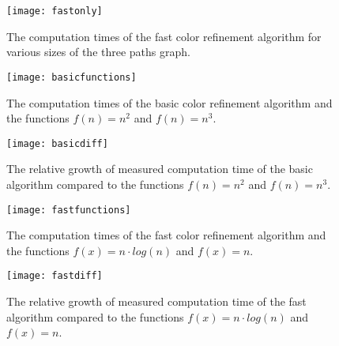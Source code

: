 \documentclass[twoside]{article}
\begin{document}
\begin{appendices}
\begin{multicols}{2}
\begin{figure}[H]
	\texttt{[image: fastonly]}
	\caption{The computation times of the fast color refinement algorithm for various sizes of the three paths graph.}
	\label{fig:fastonly}
\end{figure}

\begin{figure}[H]
	\texttt{[image: basicfunctions]}
	\caption{The computation times of the basic color refinement algorithm and the functions $f(n)=n^2$ and $f(n)=n^3$.}
	\label{fig:basicfunctions}
\end{figure}

\begin{figure}[H]
	\texttt{[image: basicdiff]}
	\caption{The relative growth of measured computation time of the basic algorithm compared to the functions $f(n)=n^2$ and $f(n)=n^3$.}
	\label{fig:basicgrowth}
\end{figure}

\begin{figure}[H]
	\texttt{[image: fastfunctions]}
	\caption{The computation times of the fast color refinement algorithm and the functions $f(x)=n\cdot log(n)$ and $f(x)=n$.}
	\label{fig:fastfunctions}
\end{figure}

\begin{figure}[H]
	\texttt{[image: fastdiff]}
	\caption{The relative growth of measured computation time of the fast algorithm compared to the functions $f(x)=n\cdot log(n)$ and $f(x)=n$.}
	\label{fig:fastgrowth}
\end{figure}
\end{multicols}


\end{appendices}
\end{document}
